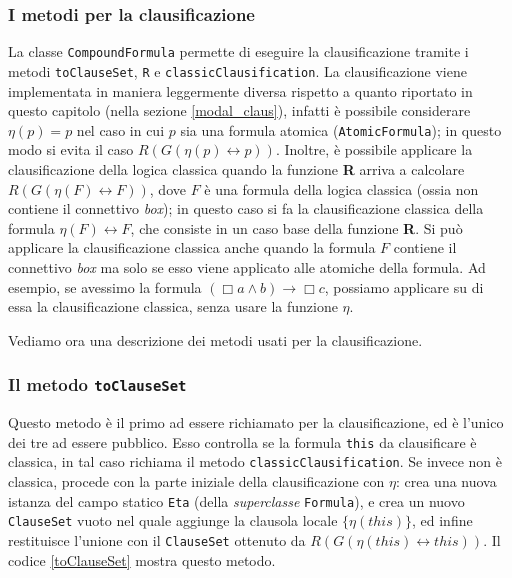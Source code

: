\documentclass[a4paper,12pt]{report}
\newcommand{\tto} {\leftrightarrow}
\begin{document}
\subsubsection{I metodi per la clausificazione}
La classe \texttt{CompoundFormula} permette di eseguire la clausificazione tramite i metodi \texttt{toClauseSet}, \texttt{R} e \texttt{classicClausification}. La clausificazione viene implementata in maniera leggermente diversa rispetto a quanto riportato in questo capitolo (nella sezione \ref{modal_claus}), infatti è possibile considerare $\eta(p) = p$ nel caso in cui $p$ sia una formula atomica (\texttt{AtomicFormula}); in questo modo si evita il caso $R(G(\eta(p) \tto p))$. Inoltre, è possibile applicare la clausificazione della logica classica quando la funzione \textbf{R} arriva a calcolare $R(G(\eta(F) \tto F))$, dove $F$ è una formula della logica classica (ossia non contiene il connettivo \emph{box}); in questo caso si fa la clausificazione classica della formula $\eta(F) \tto F$, che consiste in un caso base della funzione \textbf{R}. Si può applicare la clausificazione classica anche quando la formula $F$ contiene il connettivo \emph{box} ma solo se esso viene applicato alle atomiche della formula. Ad esempio, se avessimo la formula $(\Box a \land b) \to \Box c$, possiamo applicare su di essa la clausificazione classica, senza usare la funzione $\eta$.

Vediamo ora una descrizione dei metodi usati per la clausificazione.

\subsubsection{Il metodo \texttt{toClauseSet}}
Questo metodo è il primo ad essere richiamato per la clausificazione, ed è l'unico dei tre ad essere pubblico. Esso controlla se la formula \texttt{this} da clausificare è classica, in tal caso richiama il metodo \texttt{classicClausification}. Se invece non è classica, procede con la parte iniziale della clausificazione con $\eta$: crea una nuova istanza del campo statico \texttt{Eta} (della \emph{superclasse} \texttt{Formula}), e crea un nuovo \texttt{ClauseSet} vuoto nel quale aggiunge la clausola locale $\{\eta(this)\}$, ed infine restituisce l'unione con il \texttt{ClauseSet} ottenuto da $R(G(\eta(this) \tto this))$. Il codice \ref{toClauseSet} mostra questo metodo.
\end{document}
